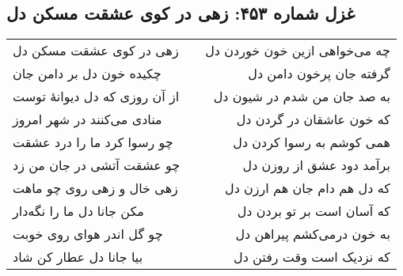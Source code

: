 \begin{center}
\section*{غزل شماره ۴۵۳: زهی در کوی عشقت مسکن دل}
\label{sec:453}
\begin{longtable}{l p{0.5cm} r}
زهی در کوی عشقت مسکن دل
&&
چه می‌خواهی ازین خون خوردن دل
\\
چکیده خون دل بر دامن جان
&&
گرفته جان پرخون دامن دل
\\
از آن روزی که دل دیوانهٔ توست
&&
به صد جان من شدم در شیون دل
\\
منادی می‌کنند در شهر امروز
&&
که خون عاشقان در گردن دل
\\
چو رسوا کرد ما را درد عشقت
&&
همی کوشم به رسوا کردن دل
\\
چو عشقت آتشی در جان من زد
&&
برآمد دود عشق از روزن دل
\\
زهی خال و زهی روی چو ماهت
&&
که دل هم دام جان هم ارزن دل
\\
مکن جانا دل ما را نگه‌دار
&&
که آسان است بر تو بردن دل
\\
چو گل اندر هوای روی خوبت
&&
به خون درمی‌کشم پیراهن دل
\\
بیا جانا دل عطار کن شاد
&&
که نزدیک است وقت رفتن دل
\\
\end{longtable}
\end{center}
